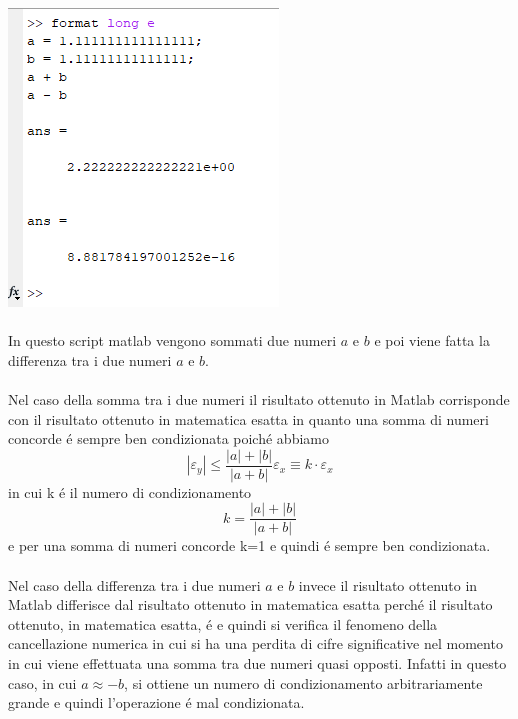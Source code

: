 \includegraphics[width=.65\linewidth]{img/ex4}\\~\\
In questo script matlab vengono sommati due numeri $a$ e $b$ e poi viene fatta la differenza tra i due numeri $a$ e $b$.\\~\\
Nel caso della somma tra i due numeri il risultato ottenuto in Matlab corrisponde con il risultato ottenuto in matematica esatta in quanto una somma di numeri concorde \'e sempre ben condizionata poich\'e abbiamo
\begin{equation}
	\left | \varepsilon_{y}  \right | \leq \frac{\left | a \right | + \left | b \right |}{\left | a + b \right |} \varepsilon_{x} \equiv k \cdot \varepsilon_{x}
\end{equation}
in cui k \'e il numero di condizionamento
\begin{equation}
k =  \frac{\left | a \right | + \left | b \right |}{\left | a + b \right |}
\end{equation}
e per una somma di numeri concorde k=1 e quindi \'e sempre ben condizionata.
\\~\\
Nel caso della differenza tra i due numeri $a$ e $b$ invece il risultato ottenuto in Matlab differisce dal risultato ottenuto in matematica esatta perch\'e il risultato ottenuto, in matematica esatta, \'e  e quindi si verifica il fenomeno della cancellazione numerica in cui si ha una perdita di cifre significative nel momento in cui viene effettuata una somma tra due numeri quasi opposti. Infatti in questo caso, in cui $a \approx -b$, si ottiene un numero di condizionamento arbitrariamente grande e quindi l'operazione \'e mal condizionata.
